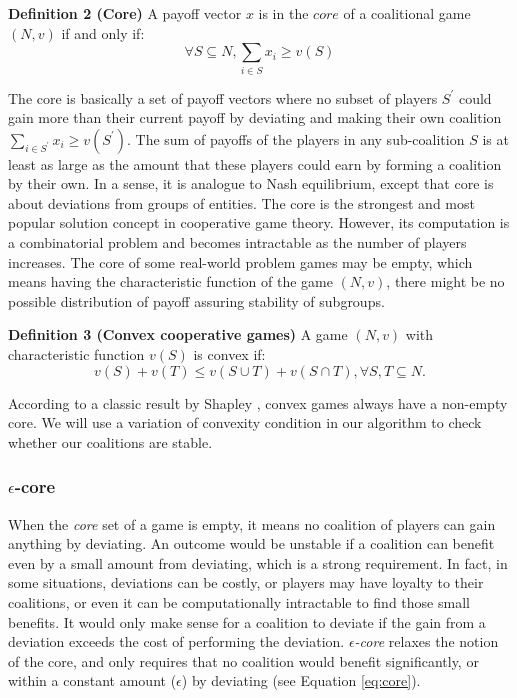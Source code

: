 \documentclass[10pt,journal,cspaper,compsoc]{IEEEtran}
\begin{document}

{\bf Definition 2 (Core)} A payoff vector $x$ is in the $core$ of
a coalitional game $(N, v)$ if and only if:
\begin{equation}\label{eq:core}
\forall S \subseteq N, \sum_{i \in S} x_i \geq v(S)
\end{equation}

The core is basically a set of payoff vectors where no subset of
players $S^\prime$ could gain more than their current payoff by
deviating and making their own coalition $\sum_{i \in S^\prime}
x_i \geq v(S^\prime)$. The sum of payoffs of the players in any
sub-coalition $S$ is at least as large as the amount that these
players could earn by forming a coalition by their own. In a
sense, it is analogue to Nash equilibrium, except that core is
about deviations from groups of entities. The core is the
strongest and most popular solution concept in cooperative game
theory. However, its computation is a combinatorial problem and
becomes intractable as the number of players increases. The core
of some real-world problem games may be empty, which means having
the characteristic function of the game $(N,v)$, there might be no
possible distribution of payoff assuring stability of subgroups.


{\bf Definition 3 (Convex cooperative games)} A game $(N,v)$ with
characteristic function $v(S)$ is convex if:
\begin{equation}\label{eq:convex}
v(S) + v(T) \leq v(S \cup T) + v (S \cap T), \forall S,T \subseteq
N.
\end{equation}


According to a classic result by Shapley \cite{S1971cores}, convex
games always have a non-empty core. We will use a variation of
convexity condition in our algorithm to check whether our
coalitions are stable.

\subsubsection*{$\epsilon$-core}\label{s:epsilon}
When the \emph{core} set of a game is empty, it means no coalition
of players can gain anything by deviating. An outcome would be
unstable if a coalition can benefit even by a small amount from
deviating, which is a strong requirement. In fact, in some
situations, deviations can be costly, or players may have loyalty
to their coalitions, or even it can be computationally intractable
to find those small benefits. It would only make sense for a
coalition to deviate if the gain from a deviation exceeds the cost
of performing the deviation. \emph{$\epsilon$-core} relaxes the
notion of the core, and only requires that no coalition would
benefit significantly, or within a constant amount ($\epsilon$) by
deviating (see Equation \ref{eq:core}).
\end{document}

